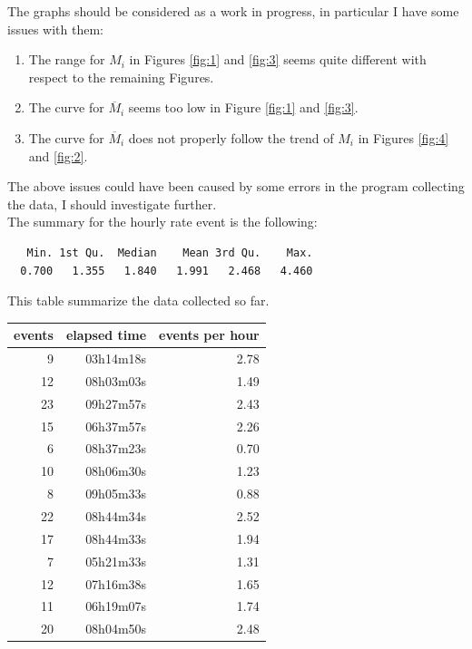 \documentclass[a4paper,12pt]{article}
\begin{document}
The graphs should be considered as a work in progress, in particular I have some 
issues with them:
\begin{enumerate}
  \item The range for $M_i$ in Figures \ref{fig:1} and \ref{fig:3} seems quite 
  different with respect to the remaining Figures.
  \item The curve for $\overline{M}_i$ seems too low in Figure \ref{fig:1} 
  and \ref{fig:3}.
  \item The curve for $\overline{M}_i$ does not properly follow the trend of 
  $M_i$ in Figures 
  \ref{fig:4} and \ref{fig:2}.
\end{enumerate}
The above issues could have been caused by some errors in the program collecting 
the data, I should investigate further.\\

The summary for the hourly rate event is the following:
\begin{verbatim}
   Min. 1st Qu.  Median    Mean 3rd Qu.    Max. 
  0.700   1.355   1.840   1.991   2.468   4.460
\end{verbatim}

This table summarize the data collected so far.
\begin{table}[ht]
\centering
\begin{tabular}{rrr}
  \hline
 events & elapsed time & events per hour \\ 
  \hline
   9 & 03h14m18s & 2.78 \\ 
   12 & 08h03m03s & 1.49 \\ 
   23 & 09h27m57s & 2.43 \\ 
   15 & 06h37m57s & 2.26 \\ 
    6 & 08h37m23s & 0.70 \\ 
   10 & 08h06m30s & 1.23 \\ 
    8 & 09h05m33s & 0.88 \\ 
   22 & 08h44m34s & 2.52 \\ 
   17 & 08h44m33s & 1.94 \\ 
    7 & 05h21m33s & 1.31 \\ 
   12 & 07h16m38s & 1.65 \\ 
   11 & 06h19m07s & 1.74 \\ 
   20 & 08h04m50s & 2.48 \\ 
   \hline
\end{tabular}
\end{table}
\end{document}
